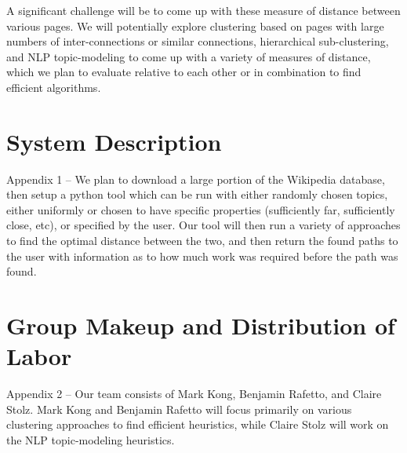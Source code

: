 \documentclass[11pt]{article}
\begin{document}
A significant challenge will be to come up with these measure of distance between various pages. We will potentially explore clustering based on pages with large numbers of inter-connections or similar connections, hierarchical sub-clustering, and NLP topic-modeling to come up with a variety of measures of distance, which we plan to evaluate relative to each other or in combination to find efficient algorithms.





\appendix

\section{System Description}

 Appendix 1 – We plan to download a large portion of the Wikipedia database, then setup a python tool which can be run with either randomly chosen topics, either uniformly or chosen to have specific properties (sufficiently far, sufficiently close, etc), or specified by the user. Our tool will then run a variety of approaches to find the optimal distance between the two, and then return the found paths to the user with information as to how much work was required before the path was found.
  

\section{Group Makeup and Distribution of Labor}

 Appendix 2 – Our team consists of Mark Kong, Benjamin Rafetto, and Claire Stolz. Mark Kong and Benjamin Rafetto will focus primarily on various clustering approaches to find efficient heuristics, while Claire Stolz will work on the NLP topic-modeling heuristics.

 

\end{document}
